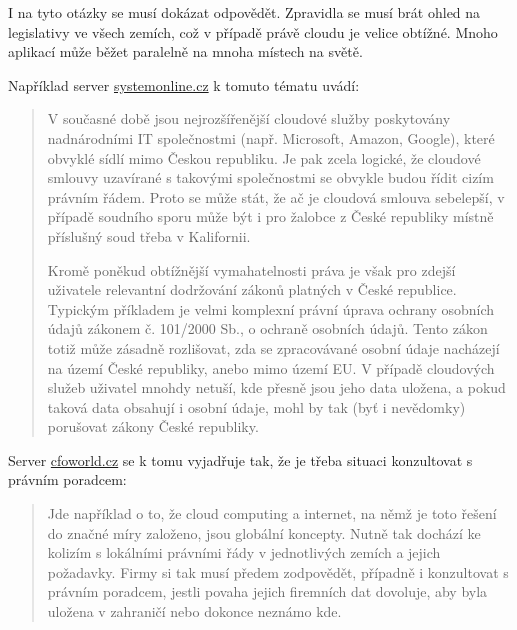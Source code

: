 I na tyto otázky se musí dokázat odpovědět. Zpravidla se musí brát ohled na legislativy ve všech zemích, což v případě právě cloudu je velice obtížné. Mnoho aplikací může běžet paralelně na mnoha místech na světě.

Například server \href{http://www.systemonline.cz/clanky/pravni-aspekty-cloud-computingu.htm}{systemonline.cz} k tomuto tématu uvádí:
\begin{quotation}
V současné době jsou nejrozšířenější cloudové služby poskytovány nadnárodními IT společnostmi (např. Microsoft, Amazon, Google), které obvyklé sídlí mimo Českou republiku. Je pak zcela logické, že cloudové smlouvy uzavírané s takovými společnostmi se obvykle budou řídit cizím právním řádem. Proto se může stát, že ač je cloudová smlouva sebelepší, v případě soudního sporu může být i pro žalobce z České republiky místně příslušný soud třeba v Kalifornii. 

Kromě poněkud obtížnější vymahatelnosti práva je však pro zdejší uživatele relevantní dodržování zákonů platných v České republice. Typickým příkladem je velmi komplexní právní úprava ochrany osobních údajů zákonem č. 101/2000 Sb., o ochraně osobních údajů. Tento zákon totiž může zásadně rozlišovat, zda se zpracovávané osobní údaje nacházejí na území České republiky, anebo mimo území EU. V případě cloudových služeb uživatel mnohdy netuší, kde přesně jsou jeho data uložena, a pokud taková data obsahují i osobní údaje, mohl by tak (byť i nevědomky) porušovat zákony České republiky.\cite{systemonline:pravniAspekty}
\end{quotation}

Server \href{http://cfoworld.cz/analyzy/cloud-computing-zajimave-moznosti-ale-i-velka-pravni-rizika-306}{cfoworld.cz} se k tomu vyjadřuje tak, že je třeba situaci konzultovat s právním poradcem:
\begin{quote}
Jde například o to, že cloud computing a internet, na němž je toto řešení do značné míry založeno, jsou globální koncepty. Nutně tak dochází ke kolizím s lokálními právními řády v jednotlivých zemích a jejich požadavky. Firmy si tak musí předem zodpovědět, případně i konzultovat s právním poradcem, jestli povaha jejich firemních dat dovoluje, aby byla uložena v zahraničí nebo dokonce neznámo kde.\cite{cfoworld:pravniRizika}
\end{quote}

